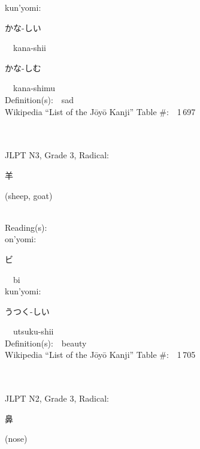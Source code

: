 \begin{multicols}{2}
{\hspace*{1em}}kun'yomi:\ \ \\
{\hspace*{2em}}{\begin{CJK}{UTF8}{min} かな-しい \end{CJK}}\ \ kana-shii\ \ \\
{\hspace*{2em}}{\begin{CJK}{UTF8}{min} かな-しむ \end{CJK}}\ \ kana-shimu\ \ \\
Definition(s):\ \ sad \\
Wikipedia ``List of the J\=oy\=o Kanji'' Table \#:\ \ 1\,697 \\
\ \ \\
{\fontsize{34pt}{40pt}  }\ \ \\  %
{JLPT N3, Grade 3, Radical:\ \ {\begin{CJK}{UTF8}{min} 羊 \end{CJK}} (sheep, goat) } \\
Reading(s):\ \ \\
{\hspace*{1em}}on'yomi:\ \ \\
{\hspace*{2em}}{\begin{CJK}{UTF8}{min} ビ \end{CJK}}\ \ bi\ \ \\
{\hspace*{1em}}kun'yomi:\ \ \\
{\hspace*{2em}}{\begin{CJK}{UTF8}{min} うつく-しい \end{CJK}}\ \ utsuku-shii\ \ \\
Definition(s):\ \ beauty \\
Wikipedia ``List of the J\=oy\=o Kanji'' Table \#:\ \ 1\,705 \\
\ \ \\
{\fontsize{34pt}{40pt}  }\ \ \\  %
{JLPT N2, Grade 3, Radical:\ \ {\begin{CJK}{UTF8}{min} 鼻 \end{CJK}} (nose) } \\

\end{multicols}
